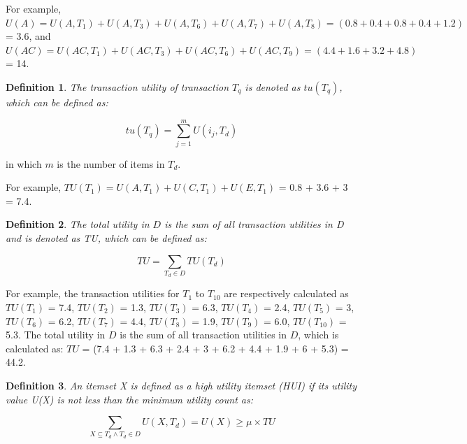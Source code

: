 \documentclass[conference]{IEEEtran}
\newtheorem{IEEEdef}{Definition}
\begin{document}
For example,  $U(A) = U(A, T_1) + U(A, T_3) + U(A, T_6) + U(A, T_7) + U(A, T_8) = (0.8 + 0.4 + 0.8 + 0.4 + 1.2)$ = 3.6, and $U(AC) = U(AC, T_1) + U(AC, T_3) + U(AC, T_6) + U(AC, T_9) = (4.4 + 1.6 + 3.2 + 4.8)$ = 14.

\begin{IEEEdef}
\label{def:TU}
The transaction utility of transaction $T_q$ is denoted as $tu(T_q)$, which can be defined as:
\end{IEEEdef}

\vspace{-0.4cm}
\begin{equation}
\label{eq:TU}
tu(T_q)
= \sum_{j=1}^{m}
U(i_j,T_d)
\end{equation}
\vspace{-0.4cm}

in which $m$ is the number of items in $T_d$.

For example, $TU(T_1) = U(A, T_1) + U(C, T_1) + U(E, T_1)$ = 0.8 + 3.6 + 3 = 7.4.

\begin{IEEEdef}
\label{def:DU}
The total utility in $D$ is the sum of all transaction utilities in D and is denoted as TU, which can be defined as:
\end{IEEEdef}

\vspace{-0.4cm}
\begin{equation}
\label{eq:DU}
TU
= \sum_{T_d \in D}
TU(T_d)
\end{equation}
\vspace{-0.4cm}

For example, the transaction utilities for $T_1$ to $T_{10}$ are respectively calculated as $TU(T_1)$ = 7.4, $TU(T_2)$ = 1.3, $TU(T_3)$ = 6.3, $TU(T_4)$ = 2.4, $TU(T_5)$ = 3, $TU(T_6)$ = 6.2, $TU(T_7)$ = 4.4, $TU(T_8)$ = 1.9, $TU(T_9)$ = 6.0, $TU(T_{10})$ = 5.3. The total utility in $D$ is the sum of all transaction utilities in $D$, which is calculated as: $TU$ = (7.4 + 1.3 + 6.3 + 2.4 + 3 + 6.2 + 4.4 + 1.9 + 6 + 5.3) = 44.2.

\begin{IEEEdef}
\label{def:HUI}
An itemset X is defined as a high utility itemset (HUI) if its utility value U(X) is not less than the minimum utility count as:
\end{IEEEdef}

\vspace{-0.4cm}
\begin{equation}
\label{eq:HUI}
\sum_{X \subseteq T_d \wedge T_d \in D}U(X,T_d)
= U(X) \geq \mu \times TU
\end{equation}
\vspace{-0.4cm}
\end{document}
